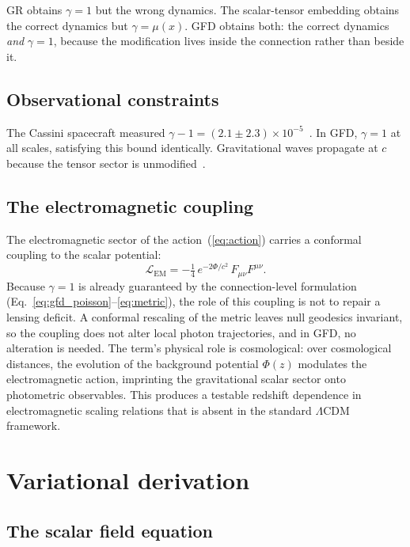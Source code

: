 \documentclass[11pt]{article}
\begin{document}
\noindent GR obtains $\gamma = 1$ but the wrong dynamics.
The scalar-tensor embedding obtains the correct dynamics
but $\gamma = \mu(x)$.  GFD obtains both: the correct
dynamics \textit{and} $\gamma = 1$, because the
modification lives inside the connection rather than
beside it.

\subsection*{Observational constraints}

The Cassini spacecraft measured
$\gamma - 1 = (2.1 \pm 2.3) \times
10^{-5}$~\cite{Bertotti2003}.  In GFD, $\gamma = 1$ at
all scales, satisfying this bound identically.
Gravitational waves propagate at $c$ because the tensor
sector is unmodified~\cite{Abbott2017}.

\subsection*{The electromagnetic coupling}

The electromagnetic sector of the
action~(\ref{eq:action}) carries a conformal coupling
to the scalar potential:
\begin{equation}
  \mathcal{L}_{\text{EM}}
    = -\tfrac{1}{4}\,e^{-2\Phi/c^2}\,
    F_{\mu\nu}F^{\mu\nu}.
  \label{eq:EM}
\end{equation}
Because $\gamma = 1$ is already guaranteed by the
connection-level formulation
(Eq.~\ref{eq:gfd_poisson}--\ref{eq:metric}), the
role of this coupling is not to repair a lensing deficit.
A conformal rescaling of the metric leaves null geodesics
invariant, so the coupling does not alter local photon
trajectories, and in GFD, no alteration is needed.
The term's physical role is cosmological: over
cosmological distances, the evolution of the background
potential $\Phi(z)$ modulates the electromagnetic action,
imprinting the gravitational scalar sector onto
photometric observables.  This produces a testable
redshift dependence in electromagnetic scaling relations
that is absent in the standard $\Lambda$CDM framework.

\section{Variational derivation}

\subsection*{The scalar field equation}
\end{document}
